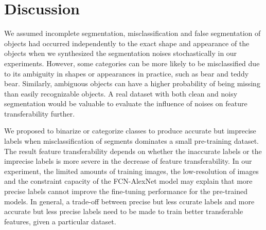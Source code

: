 \section{Discussion}
\label{sec:discussion}


We assumed incomplete segmentation, misclassification and false segmentation of objects had occurred independently to the exact shape and appearance of the objects when we synthesized the segmentation noises stochastically in our experiments.
However, some categories can be more likely to be misclassified due to its ambiguity in shapes or appearances in practice, such as bear and teddy bear.
Similarly,  ambiguous objects can have a higher probability of being missing than easily recognizable objects.
A real dataset with both clean and noisy segmentation would be valuable to evaluate the influence of noises on feature transferability further.


We proposed to binarize or categorize classes to produce accurate but imprecise labels when misclassification of segments dominates a small pre-training dataset.
The result feature transferability depends on whether the inaccurate labels or the imprecise labels is more severe in the decrease of feature transferability.
In our experiment, the limited amounts of training images, the low-resolution of images and the constraint capacity of the FCN-AlexNet model may explain that more precise labels cannot improve the fine-tuning performance for the pre-trained models.
In general, a trade-off between precise but less ccurate labels and more accurate but less precise labels need to be made to train better transferable features, given a particular dataset.



